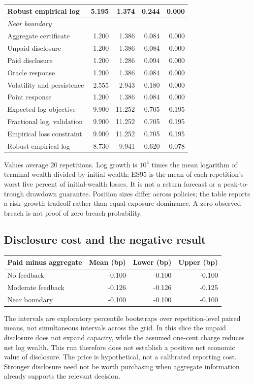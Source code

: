 \documentclass[12pt]{article}
\theoremstyle{definition}
\theoremstyle{remark}
\begin{document}
{\begin{longtable}{p{}rrrr}
Robust empirical log & 5.195 & 1.374 & 0.244 & 0.000\\
\midrule
\multicolumn{5}{l}{\textit{Near boundary}}\\
Aggregate certificate & 1.200 & 1.386 & 0.084 & 0.000\\
Unpaid disclosure & 1.200 & 1.386 & 0.084 & 0.000\\
Paid disclosure & 1.200 & 1.286 & 0.094 & 0.000\\
Oracle response & 1.200 & 1.386 & 0.084 & 0.000\\
Volatility and persistence & 2.555 & 2.943 & 0.180 & 0.000\\
Point response & 1.200 & 1.386 & 0.084 & 0.000\\
Expected-log objective & 9.900 & 11.252 & 0.705 & 0.195\\
Fractional log, validation & 9.900 & 11.252 & 0.705 & 0.195\\
Empirical loss constraint & 9.900 & 11.252 & 0.705 & 0.195\\
Robust empirical log & 8.730 & 9.941 & 0.620 & 0.078\\
\midrule
\bottomrule
\end{longtable}}
Values average 20 repetitions. Log growth is $10^4$ times the mean logarithm
of terminal wealth divided by initial wealth; ES95 is the mean of each
repetition's worst five percent of initial-wealth losses. It is not a return
forecast or a peak-to-trough drawdown guarantee. Position sizes differ across
policies; the table reports a risk--growth tradeoff rather than equal-exposure
dominance. A zero observed breach is not proof of zero breach probability.

\subsection*{Disclosure cost and the negative result}
\begin{center}\small
\begin{tabular}{lrrr}
\toprule
Paid minus aggregate & Mean (bp) & Lower (bp) & Upper (bp)\\
\midrule
No feedback & -0.100 & -0.100 & -0.100\\
Moderate feedback & -0.126 & -0.126 & -0.125\\
Near boundary & -0.100 & -0.100 & -0.100\\
\bottomrule
\end{tabular}
\end{center}
The intervals are exploratory percentile bootstraps over repetition-level
paired means, not simultaneous intervals across the grid. In this slice the
unpaid disclosure does not expand capacity, while the assumed one-cent charge
reduces net log wealth. This run therefore does not establish a positive net
economic value of disclosure. The price is hypothetical, not a calibrated
reporting cost. Stronger disclosure need not be worth purchasing when aggregate
information already supports the relevant decision.
\end{document}
